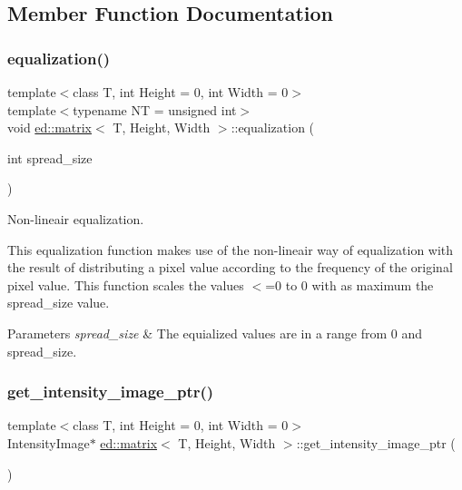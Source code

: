 \subsection{Member Function Documentation}
\mbox{\label{classed_1_1matrix_a49e7d0658023caeafc6cf25385b74872}} 
\subsubsection{\texorpdfstring{equalization()}{equalization()}}
{\footnotesize\ttfamily template$<$class T, int Height = 0, int Width = 0$>$ \\
template$<$typename NT  = unsigned int$>$ \\
void \mbox{\hyperlink{classed_1_1matrix}{ed\+::matrix}}$<$ T, Height, Width $>$\+::equalization (\begin{DoxyParamCaption}\item[{int}]{spread\+\_\+size }\end{DoxyParamCaption})\hspace{0.3cm}{\ttfamily [inline]}}



Non-\/lineair equalization. 

This equalization function makes use of the non-\/lineair way of equalization with the result of distributing a pixel value according to the frequency of the original pixel value. This function scales the values $<$=0 to 0 with as maximum the spread\+\_\+size value.


\begin{DoxyParams}{Parameters}
{\em spread\+\_\+size} & The equialized values are in a range from 0 and spread\+\_\+size. \\
\hline
\end{DoxyParams}
\mbox{\label{classed_1_1matrix_a2adb72ad2c0829cf6efc33d6984308e6}} 
\subsubsection{\texorpdfstring{get\+\_\+intensity\+\_\+image\+\_\+ptr()}{get\_intensity\_image\_ptr()}}
{\footnotesize\ttfamily template$<$class T, int Height = 0, int Width = 0$>$ \\
Intensity\+Image$\ast$ \mbox{\hyperlink{classed_1_1matrix}{ed\+::matrix}}$<$ T, Height, Width $>$\+::get\+\_\+intensity\+\_\+image\+\_\+ptr (\begin{DoxyParamCaption}{ }\end{DoxyParamCaption})\hspace{0.3cm}{\ttfamily [inline]}}



